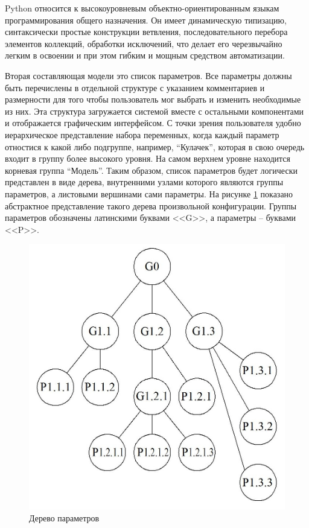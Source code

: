 \documentclass[14pt,oneside,final]{extreport}
\begin{document}
	Python относится к высокоуровневым объектно-ориентированным языкам программирования общего назначения. Он имеет динамическую типизацию, синтаксически простые конструкции ветвления, последовательного перебора элементов коллекций, обработки исключений, что делает его черезвычайно легким в освоении и при этом гибким и мощным средством автоматизации. 
	
	Вторая составляющая модели это список параметров. Все параметры должны быть перечислены в отдельной структуре с указанием комментариев и размерности для того чтобы пользователь мог выбрать и изменить необходимые из них. Эта структура загружается системой вместе с остальными компонентами и отображается графическим интерфейсом.  С точки зрения пользователя удобно иерархическое представление набора переменных, когда каждый параметр отностися к какой либо подгруппе, например, ``Кулачек'', которая в свою очередь входит в группу более высокого уровня. На самом верхнем уровне находится корневая группа ``Модель''. Таким образом, список параметров будет логически представлен в виде дерева, внутренними узлами которого являются группы параметров, а листовыми вершинами сами параметры. На рисунке \ref{fig:model-tree-abstract} показано абстрактное представление такого дерева произвольной конфигурации. Группы параметров обозначены латинскими буквами <<G>>, а параметры -- буквами <<P>>.  
	
	\begin{figure}[!h]
		\begin{center}
			\includegraphics[scale=1]{img/model-tree-abstract} 
		\end{center}
		\caption{Дерево параметров}
		\label{fig:model-tree-abstract}
	\end{figure}
		
\end{document}
